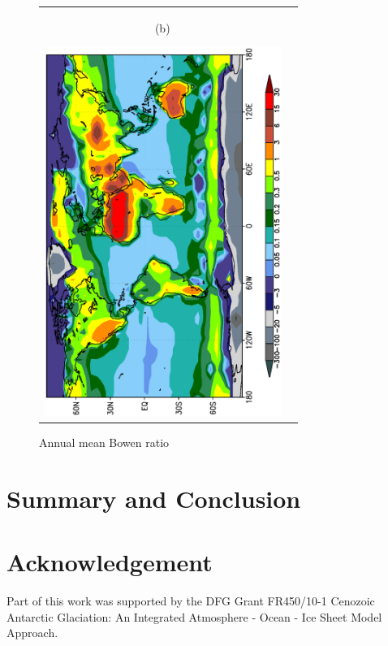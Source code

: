 \documentclass[12pt,a4paper,twoside,openright,headinclude,liststotoc,bibtotoc]{scrreprt}
\begin{document}
\begin{figure}[c]
\begin{tabular}{cc}
\begin{minipage}{1.0\textwidth}
\begin{center}
\begin{scriptsize}(b)\end{scriptsize}\hspace{-1cm}\includegraphics[height=12.0cm,angle=-90]{eps/zonalt21tmbowen.eps}
\end{center}
\end{minipage}
\end{tabular}
\caption[Bowen ratio]{Annual mean Bowen ratio}
\label{img:bowen}
\end{figure}

\vspace{-0.4cm}
\chapter{Summary and Conclusion}
\vspace{-0.4cm}


\vspace{-0.4cm}
\chapter{Acknowledgement}
\vspace{-0.4cm}
Part of this work was supported by the DFG Grant FR450/10-1
Cenozoic Antarctic Glaciation:
An Integrated Atmosphere - Ocean - Ice Sheet Model Approach.



\end{document}
